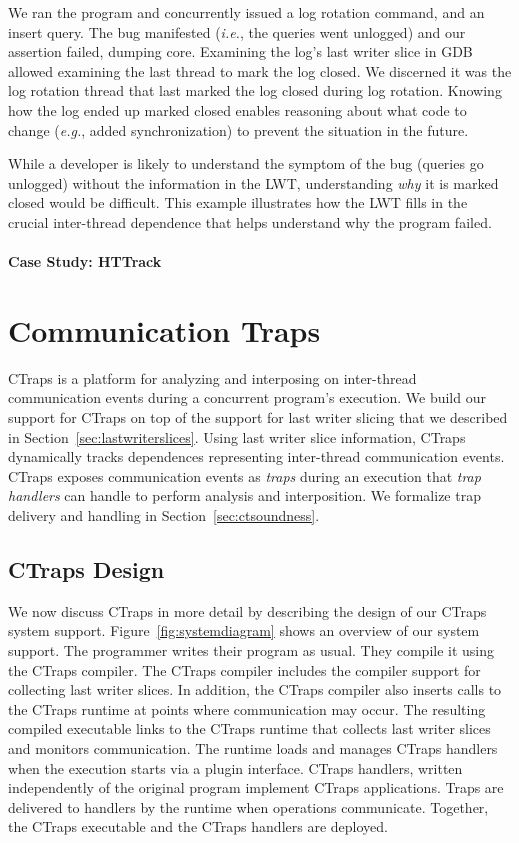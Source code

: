 \documentclass[preprint,9pt]{sigplanconf}
\newcommand{\ctraps}{CTraps\xspace}
\newcommand{\lwt}{LWT\xspace}
\begin{document}
We ran the program and concurrently issued a log rotation command, and an
insert query.  The bug manifested ({\em i.e.}, the queries went unlogged) and
our assertion failed, dumping core.  Examining the log's last writer slice in
GDB allowed examining the last thread to mark the log closed.  We discerned it
was the log rotation thread that last marked the log closed during log
rotation.  Knowing how the log ended up marked closed enables reasoning about
what code to change ({\em e.g.}, added synchronization) to prevent the
situation in the future.

While a developer is likely to understand the symptom of the bug (queries go
unlogged) without the information in the \lwt, understanding {\em why} it is marked closed would be
difficult.  This example illustrates how the \lwt fills in the crucial inter-thread
dependence that helps understand why the program failed.

\paragraph{Case Study: HTTrack}


\section{Communication Traps}
\label{sec:ctraps}

\ctraps is a platform for analyzing and interposing on inter-thread
communication events during a concurrent program's execution.  We build our
support for \ctraps on top of the support for last writer slicing that we
described in Section~\ref{sec:lastwriterslices}.  Using last writer slice
information, \ctraps dynamically tracks dependences representing inter-thread
communication events. \ctraps exposes communication events as {\em traps}
during an execution that {\em trap handlers} can handle to perform analysis
and interposition.  We formalize trap delivery and handling in
Section~\ref{sec:ctsoundness}.

\subsection{\ctraps Design}

We now discuss \ctraps in more detail by describing the design of our \ctraps
system support.  Figure~\ref{fig:systemdiagram} shows an overview of our system
support.  The programmer writes their program as usual.  They compile it using
the \ctraps compiler. The \ctraps compiler includes the compiler support for
collecting last writer slices.  In addition, the \ctraps compiler also inserts
calls to the \ctraps runtime at points where communication may occur.  The
resulting compiled executable links to the \ctraps runtime that collects last
writer slices and monitors communication.  The runtime loads and manages \ctraps
handlers when the execution starts via a plugin interface.  \ctraps handlers,
written independently of the original program implement \ctraps applications.
Traps are delivered to handlers by the runtime when operations communicate.
Together, the \ctraps executable and the \ctraps handlers are deployed.
\end{document}
